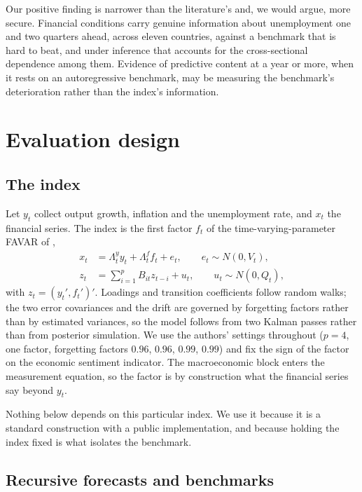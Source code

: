 \documentclass[12pt]{article}
\begin{document}
Our positive finding is narrower than the literature's and, we would argue,
more secure. Financial conditions carry genuine information about unemployment
one and two quarters ahead, across eleven countries, against a benchmark that
is hard to beat, and under inference that accounts for the cross-sectional
dependence among them. Evidence of predictive content at a year or more, when
it rests on an autoregressive benchmark, may be measuring the benchmark's
deterioration rather than the index's information.

\section{Evaluation design}

\subsection{The index}

Let $y_t$ collect output growth, inflation and the unemployment rate, and $x_t$
the financial series. The index is the first factor $f_t$ of the
time-varying-parameter FAVAR of \citet{koop2014},
\begin{align}
x_t &= \Lambda^y_t y_t + \Lambda^f_t f_t + e_t, \qquad e_t \sim N(0, V_t), \\
z_t &= \sum\nolimits_{i=1}^{p} B_{it} z_{t-i} + u_t, \qquad u_t \sim N(0, Q_t),
\end{align}
with $z_t = (y_t', f_t')'$. Loadings and transition coefficients follow random
walks; the two error covariances and the drift are governed by forgetting
factors rather than by estimated variances, so the model follows from two
Kalman passes rather than from posterior simulation. We use the authors'
settings throughout ($p = 4$, one factor, forgetting factors $0.96$, $0.96$,
$0.99$, $0.99$) and fix the sign of the factor on the economic sentiment
indicator. The macroeconomic block enters the measurement equation, so the
factor is by construction what the financial series say beyond $y_t$.

Nothing below depends on this particular index. We use it because it is a
standard construction with a public implementation, and because holding the
index fixed is what isolates the benchmark.

\subsection{Recursive forecasts and benchmarks}
\end{document}
